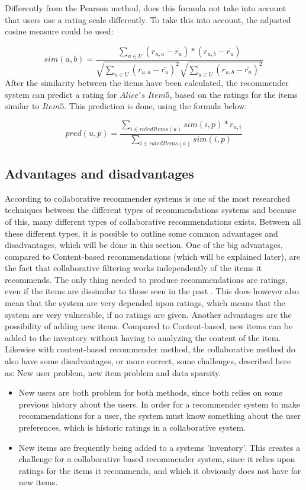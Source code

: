 Differently from the Pearson method, does this formula not take into account that users use a rating scale differently. To take this into account, the adjusted cosine measure could be used:

\[
	sim(a,b) = \frac{\sum_{u \in U}(r_{u,a} - \bar{r_{u}})*(r_{u,b} - \bar{r_{u}})}{\sqrt{\sum_{u \in U}(r_{u,a} - \bar{r_{u}})^2}\sqrt{\sum_{u \in U} (r_{u,b} - \bar{r_{u}})^2}}
\]
After the similarity between the items have been calculated, the recommender system can predict a rating for \(Alice's\) \(Item5\), based on the ratings for the items similar to \(Item5\). This prediction is done, using the formula below:

\[
	pred(u,p) = \frac{\sum_{i\in ratedItems(u)} sim(i,p) * r_{u,i}}{\sum_{i \in ratedItems(a)} sim(i,p)}
\]


\subsection{Advantages and disadvantages}
According to \citep{IntroductionRecommenderSystems} collaborative recommender systems is one of the most researched techniques between the different types of recommendations systems and because of this, many different types of collaborative recommendations exists. Between all these different types, it is possible to outline some common advantages and disadvantages, which will be done in this section.\newline
One of the big advantages, compared to Content-based recommendations (which will be explained later), are the fact that collaborative filtering works independently of the items it recommends. The only thing needed to produce recommendations are ratings, even if the items are dissimilar to those seen in the past \citep[p. 18]{TowardsTheNextGenerationOfRs}. This does however also mean that the system are very depended upon ratings, which means that the system are very vulnerable, if no ratings are given. Another advantages are the possibility of adding new items. Compared to Content-based, new items can be added to the inventory without having to analyzing the content of the item. 
Likewise with content-based recommender method, the collaborative method do also have some disadvantages, or more correct, some challenges, described here as: New user problem, new item problem and data sparsity. 
\begin{itemize}
	\item New users are both problem for both methods, since both relies on some previous history about the users. In order for a recommender system to make recommendations for a user, the system must know something about the user preferences, which is historic ratings in a collaborative system. 
	\item New items are frequently being added to a systems 'inventory'. This creates a challenge for a collaborative based recommender system, since it relies upon ratings for the items it recommends, and which it obviously does not have for new items.  
\end{itemize}